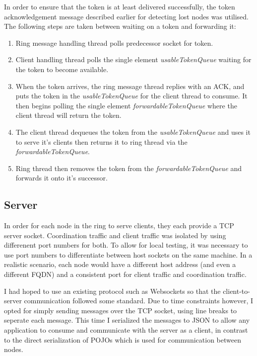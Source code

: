 \documentclass[12pt]{article}
\begin{document}
In order to ensure that the token is at least delivered successfully, the token acknowledgement message described earlier for detecting lost nodes was utilised. The following steps are taken between waiting on a token and forwarding it:

\begin{enumerate}
	\item Ring message handling thread polls predecessor socket for token.
	\item Client handling thread polls the single element \emph{usableTokenQueue} waiting for the token to become available.
	\item When the token arrives, the ring message thread replies with an ACK, and puts the token in the \emph{usableTokenQueue} for the client thread to consume. It then begins polling the single element \emph{forwardableTokenQueue} where the client thread will return the token.
	\item The client thread dequeues the token from the \emph{usableTokenQueue} and uses it to serve it's clients then returns it to ring thread via the \emph{forwardableTokenQueue}.
	\item Ring thread then removes the token from the \emph{forwardableTokenQueue} and forwards it onto it's successor.
\end{enumerate}

\subsection{Server}

In order for each node in the ring to serve clients, they each provide a TCP server socket. Coordination traffic and client traffic was isolated by using differenent port numbers for both. To allow for local testing, it was necessary to use port numbers to differentiate between host sockets on the same machine. In a realistic scenario, each node would have a different host address (and even a different FQDN) and a consistent port for client traffic and coordination traffic. 

I had hoped to use an existing protocol such as Websockets so that the client-to-server communication followed some standard. Due to time constraints however, I opted for simply sending messages over the TCP socket, using line breaks to seperate each message. This time I serialized the messages to JSON to allow any application to consume and communicate with the server as a client, in contrast to the direct serialization of POJOs which is used for communication between nodes.
\end{document}
